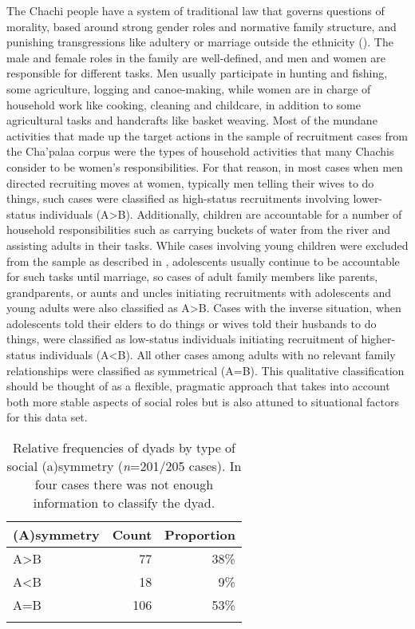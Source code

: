 \documentclass[output=paper]{langsci/langscibook}
\begin{document}
The Chachi people have a system of traditional law that governs questions of morality, based around strong gender roles and normative family structure, and punishing transgressions like adultery or marriage outside the ethnicity (\citealt{Barrett1925,Altschuler1964,Floyd2010}). The male and female roles in the family are well-defined, and men and women are responsible for different tasks. Men usually participate in hunting and fishing, some agriculture, logging and canoe-making, while women are in charge of household work like cooking, cleaning and childcare, in addition to some agricultural tasks and handcrafts like basket weaving. Most of the mundane activities that made up the target actions in the sample of recruitment cases from the Cha'palaa corpus were the types of household activities that many Chachis consider to be women's responsibilities. For that reason, in most cases when men directed recruiting moves at women, typically men telling their wives to do things, such cases were classified as high-status recruitments involving lower-status individuals (A>B). Additionally, children are accountable for a number of household responsibilities such as carrying buckets of water from the river and assisting adults in their tasks. While cases involving young children were excluded from the sample as described in , adolescents usually continue to be accountable for such tasks until marriage, so cases of adult family members like parents, grandparents, or aunts and uncles initiating recruitments with adolescents and young adults were also classified as A>B. Cases with the inverse situation, when adolescents told their elders to do things or wives told their husbands to do things, were classified as low-status individuals initiating recruitment of higher-status individuals (A<B). All other cases among adults with no relevant family relationships were classified as symmetrical (A=B). This qualitative classification should be thought of as a flexible, pragmatic approach that takes into account both more stable aspects of social roles but is also attuned to situational factors for this data set.

\begin{table}
\begin{tabularx}{0.66\textwidth}{Xrr}
\lsptoprule
(A)symmetry & Count & Proportion \\
\midrule
A>B & 77 & 38\%\\
A<B & 18 & 9\%\\
A=B & 106 & 53\%\\
\lspbottomrule
\end{tabularx}
\caption{Relative frequencies of dyads by type of social (a)symmetry (\textit{n}=201/205 cases). In four cases there was not enough information to classify the dyad.}
\label{tab:floyd:6}
\end{table}
\end{document}
